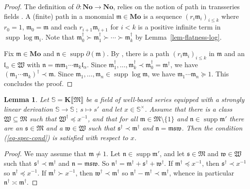 \documentclass{article}
\newcommand{\of}{:}
\newcommand{\tmem}[1]{{\em #1\/}}
\newcommand{\tmop}[1]{\ensuremath{\operatorname{#1}}}
\newtheorem{lemma}[theorem]{Lemma}
\theoremstyle{remark}\newtheorem*{convention*}{Convention}
\begin{document}
\begin{proof}
  The definition of $\partial \of \mathbf{No} \longrightarrow \mathbf{No}$,
  relies {\cite[Definition~6.11]{BM18}} on the notion of path in transseries
  fields {\cite{Schm01}}. A (finite) path in a monomial $\mathfrak{m} \in
  \mathbf{Mo}$ is a sequence $(r_i \mathfrak{m}_i)_{i \leqslant k}$ where $r_0
  = 1$, $\mathfrak{m}_0 =\mathfrak{m}$ and each $r_{i + 1} \mathfrak{m}_{i +
  1}$ for $i < k$ is a positive infinite term in $\tmop{supp} \log
  \mathfrak{m}_i$. Note that $\mathfrak{m}_0^{\dag} \succ
  \mathfrak{m}_1^{\dag} \succ \cdots \succ \mathfrak{m}_k^{\dag}$ by
  Lemma~\ref{lem-flatness-log}.
  
  Fix $\mathfrak{m} \in \mathbf{Mo}$ and $\mathfrak{n} \in \tmop{supp}
  \partial (\mathfrak{m})$. By {\cite[Definitions~6.13 and~6.7]{BM18}}, there
  is a path $(r_i \mathfrak{m}_i)_{i \leqslant k}$ in $\mathfrak{m}$ and an
  $\mathfrak{l}_{\alpha} \in \mathfrak{W}$ with
  $\mathfrak{n}=\mathfrak{m}\mathfrak{m}_1 \cdots \mathfrak{m}_k
  \mathfrak{l}_{\alpha}$. Since $\mathfrak{m}_1^{\dag}, \ldots,
  \mathfrak{m}_k^{\dag} \prec \mathfrak{m}_0^{\dag} =\mathfrak{m}^{\dag}$, we
  have $(\mathfrak{m}_1 \cdots \mathfrak{m}_k)^{\dag} \prec \mathfrak{m}$.
  Since $\mathfrak{m}_1, \ldots, \mathfrak{m}_n \in \tmop{supp} \log
  \mathfrak{m}$, we have $\mathfrak{m}_1 \cdots \mathfrak{m}_n \succcurlyeq
  1$. This concludes the proof.
\end{proof}

\begin{lemma}
  \label{lem-der-dichotomy}Let $\mathbb{S}= \mathbf{K} \llbracket \mathfrak{M}
  \rrbracket$ be a field of well-based series equipped with a strongly linear
  derivation $\mathbb{S} \longrightarrow \mathbb{S} \: ; \: s \mapsto s'$ and
  let $x \in \mathbb{S}^{\times}$. Assume that there is a class $\mathfrak{W}
  \subseteq \mathfrak{M}$ such that $\mathfrak{W}^{\dag} \preccurlyeq x^{-
  1}$, and that for all $\mathfrak{m} \in \mathfrak{M} \setminus \{1\}$ and
  $\mathfrak{n} \in \tmop{supp} \mathfrak{m}'$ there are an $\mathfrak{s} \in
  \mathfrak{M}$ and a $\mathfrak{w} \in \mathfrak{W}$ such that
  $\mathfrak{s}^{\dag} \prec \mathfrak{m}^{\dag}$ and
  $\mathfrak{n}=\mathfrak{m}\mathfrak{s}\mathfrak{w}$. Then the condition
  {\tmem{(\ref{eq-spec-cond})}} is satisfied with respect to $x$.
\end{lemma}

\begin{proof}
  We may assume that $\mathfrak{m} \neq 1$. Let $\mathfrak{n} \in \tmop{supp}
  \mathfrak{m}'$, and let $\mathfrak{s} \in \mathfrak{M}$ and $\mathfrak{w}
  \in \mathfrak{W}$ such that $\mathfrak{s}^{\dag} \prec \mathfrak{m}^{\dag}$
  and $\mathfrak{n}=\mathfrak{m}\mathfrak{s}\mathfrak{w}$. So
  $\mathfrak{n}^{\dag} =\mathfrak{m}^{\dag} +\mathfrak{s}^{\dag}
  +\mathfrak{w}^{\dag}$. If $\mathfrak{m}^{\dag} \preccurlyeq x^{- 1}$, then
  $\mathfrak{s}^{\dag} \prec x^{- 1}$ so $\mathfrak{n}^{\dag} \preccurlyeq
  x^{- 1}$. If $\mathfrak{m}^{\dag} \succ x^{- 1}$, then $\mathfrak{w}^{\dag}
  \prec \mathfrak{m}^{\dag}$ so $\mathfrak{n}^{\dag} -\mathfrak{m}^{\dag}
  \prec \mathfrak{m}^{\dag}$, whence in particular~$\mathfrak{n}^{\dag} \asymp
  \mathfrak{m}^{\dag}$. \end{proof}
\end{document}
